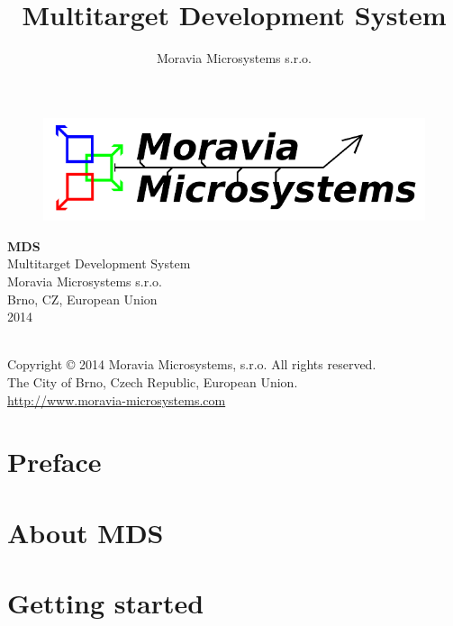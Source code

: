 \documentclass[a4paper,twosided, 15pt]{book}
\title{Multitarget Development System}
\author{Moravia Microsystems s.r.o.}
\begin{document}
    \begin{titlepage}
        \begin{figure}[ht!]
            \centering
            \includegraphics[width=.9\textwidth]{img/Moravia_Microsystems.png}
        \end{figure}
        \begin{center}
            \fontsize{35.83pt}{60pt} \selectfont{}
            \textbf{MDS}
            \\[1cm]
            \fontsize{25pt}{30pt} \selectfont{}
            Multitarget Development System
            \\[2cm]
            \fontsize{15pt}{19pt} \selectfont{}
            Moravia Microsystems s.r.o.\\
            Brno, CZ, European Union\\
            2014
        \end{center}
    \end{titlepage}

    {
        ~\\
        Copyright \copyright{} 2014 Moravia Microsystems, s.r.o. All rights reserved.\\
        The City of Brno, Czech Republic, European Union.\\
        \href{http://www.moravia-microsystems.com}{http://www.moravia-microsystems.com}
    }

    \tableofcontents

    \chapter{Preface}
        

    \chapter{About MDS}
        

    \chapter{Getting started}
        
\end{document}
